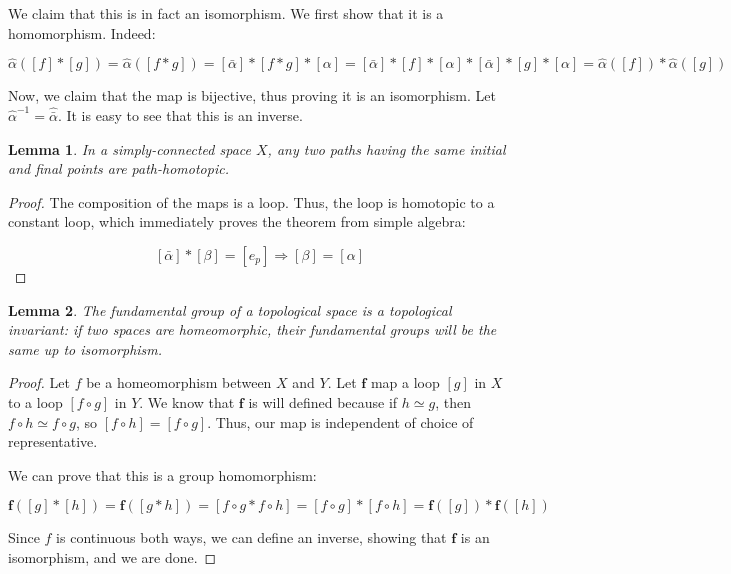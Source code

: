 \documentclass[10pt, oneside]{amsart}
\newtheorem{lem}{Lemma}
\begin{document}
    We claim that this is in fact an isomorphism. We first show that it is a homomorphism. Indeed:

    $$\hat{\alpha} ( [f] * [g] ) = \hat{\alpha} ([f * g]) = [\bar{\alpha}] * [f * g] * [\alpha] = [\bar{\alpha}] * [f] * [\alpha] * [\bar{\alpha}] * [g] * [\alpha] = \hat{\alpha}([f]) * \hat{\alpha}([g])$$

    Now, we claim that the map is bijective, thus proving it is an isomorphism. Let $\hat{\alpha}^{-1} = \hat{\bar{\alpha}}$. It is easy to see that this is an inverse.
    \newline

    \begin{lem}
      In a simply-connected space $X$, any two paths having the same initial and final points are path-homotopic.
    \end{lem}

    \begin{proof}
      The composition of the maps is a loop. Thus, the loop is homotopic to a constant loop, which immediately proves the theorem from simple algebra:

      $$[\bar{\alpha}] * [\beta] = [e_p] \Rightarrow [\beta] = [\alpha]$$
    \end{proof}

    \begin{lem}
      The fundamental group of a topological space is a topological invariant: if two spaces are homeomorphic, their fundamental groups will be the same
      up to isomorphism.
    \end{lem}

    \begin{proof}
      Let $f$ be a homeomorphism between $X$ and $Y$. Let $\textbf{f}$ map a loop $[g]$ in $X$ to a loop $[f \circ g]$ in $Y$. We know that $\textbf{f}$ is will defined because
      if $h \simeq g$, then $f \circ h \simeq f \circ g$, so $[f \circ h] = [f \circ g]$. Thus, our map is independent of choice of representative.
      \newline

      We can prove that this is a group homomorphism:

      $$\textbf{f}([g] * [h]) = \textbf{f}([g * h]) = [f \circ g * f \circ h] = [f \circ g] * [f \circ h] = \textbf{f}([g]) * \textbf{f}([h])$$

      Since $f$ is continuous both ways, we can define an inverse, showing that $\textbf{f}$ is an isomorphism, and we are done.
    \end{proof}
\end{document}
